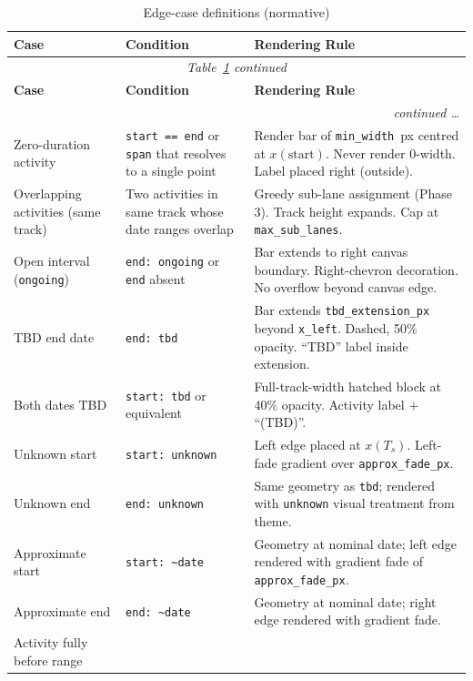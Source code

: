 \begin{longtable}{@{}p{3.2cm}p{3.4cm}p{5.8cm}@{}}
\caption{Edge-case definitions (normative)}
\label{tab:edge-cases} \\
\toprule
\textbf{Case} & \textbf{Condition} & \textbf{Rendering Rule} \\
\midrule
\endfirsthead
\multicolumn{3}{c}{\small\textit{Table~\ref{tab:edge-cases} continued}} \\[2pt]
\toprule
\textbf{Case} & \textbf{Condition} & \textbf{Rendering Rule} \\
\midrule
\endhead
\midrule
\multicolumn{3}{r}{\small\textit{continued \ldots}} \\
\endfoot
\bottomrule
\endlastfoot
Zero-duration activity &
  \texttt{start == end} or \texttt{span} that resolves to a single point &
  Render bar of \texttt{min\_width}~px centred at $x(\text{start})$. Never render 0-width. Label placed right (outside). \\[4pt]
Overlapping activities (same track) &
  Two activities in same track whose date ranges overlap &
  Greedy sub-lane assignment (Phase 3). Track height expands. Cap at \texttt{max\_sub\_lanes}. \\[4pt]
Open interval (\texttt{ongoing}) &
  \texttt{end: ongoing} or \texttt{end} absent &
  Bar extends to right canvas boundary. Right-chevron decoration. No overflow beyond canvas edge. \\[4pt]
TBD end date &
  \texttt{end: tbd} &
  Bar extends \texttt{tbd\_extension\_px} beyond \texttt{x\_left}. Dashed, 50\% opacity. ``TBD'' label inside extension. \\[4pt]
Both dates TBD &
  \texttt{start: tbd} or equivalent &
  Full-track-width hatched block at 40\% opacity. Activity label $+$ ``(TBD)''. \\[4pt]
Unknown start &
  \texttt{start: unknown} &
  Left edge placed at $x(T_s)$. Left-fade gradient over \texttt{approx\_fade\_px}. \\[4pt]
Unknown end &
  \texttt{end: unknown} &
  Same geometry as \texttt{tbd}; rendered with \texttt{unknown} visual treatment from theme. \\[4pt]
Approximate start &
  \texttt{start: \textasciitilde{}date} &
  Geometry at nominal date; left edge rendered with gradient fade of \texttt{approx\_fade\_px}. \\[4pt]
Approximate end &
  \texttt{end: \textasciitilde{}date} &
  Geometry at nominal date; right edge rendered with gradient fade. \\[4pt]
Activity fully before range &

\end{longtable}
